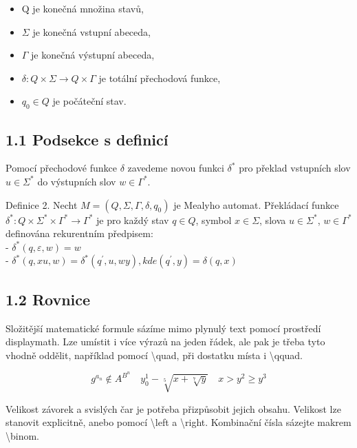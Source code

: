 \documentclass[a4paper, 11pt, twocolumn]{article}[25.2.2024]
\begin{document}
\newtheorem{Definice 1.}{\emph{Konečný přepisovací stroj} neboli \emph{Mealyho automat} je definován jako uspoŕádaná pětice tvaru M = (Q, Σ, Γ, δ, q0), kde:}

\begin{itemize}
  \item Q je konečná množina stavů,
  \item $\Sigma$ je konečná vstupní abeceda,
  \item $\Gamma$ je konečná výstupní abeceda,
  \item $\delta: Q \times \Sigma \rightarrow Q \times \Gamma$ je totální přechodová funkce,
  \item $q_{0} \in Q$ je počáteční stav.
\end{itemize}

\subsection*{1.1 Podsekce s definicí}
Pomocí přechodové funkce $\delta$ zavedeme novou funkci $\delta^{*}$ pro překlad vstupních slov $u \in \Sigma^{*}$ do výstupních slov $w \in \Gamma^{*}$.

Definice 2. Necht $M=\left(Q, \Sigma, \Gamma, \delta, q_{0}\right)$ je Mealyho automat. Překládací funkce $\delta^{*}: Q \times \Sigma^{*} \times \Gamma^{*} \rightarrow \Gamma^{*}$ je pro každý stav $q \in Q$, symbol $x \in \Sigma$, slova $u \in \Sigma^{*}$, $w \in \Gamma^{*}$ definována rekurentním předpisem:\\
- $\delta^{*}(q, \varepsilon, w)=w$\\
- $\delta^{*}(q, x u, w)=\delta^{*}\left(q^{\prime}, u, w y\right), k d e\left(q^{\prime}, y\right)=\delta(q, x)$

\subsection*{1.2 Rovnice}
Složitější matematické formule sázíme mimo plynulý text pomocí prostředí displaymath. Lze umístit i více výrazů na jeden řádek, ale pak je třeba tyto vhodně oddělit, například pomocí \textbackslash quad, při dostatku místa i \textbackslash qquad.

$$
g^{a_{n}} \notin A^{B^{n}} \quad y_{0}^{1}-\sqrt[5]{x+\sqrt[7]{y}} \quad x>y^{2} \geq y^{3}
$$

Velikost závorek a svislých čar je potřeba přizpůsobit jejich obsahu. Velikost lze stanovit explicitně, anebo pomocí \textbackslash left a \textbackslash right. Kombinační čísla sázejte makrem \textbackslash binom.
\end{document}

